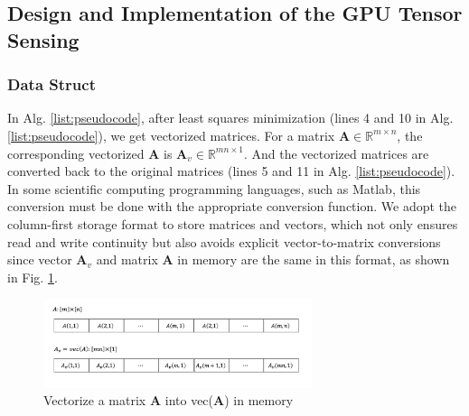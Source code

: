 \documentclass[futureinternet,article,submit,moreauthors,pdftex,10pt,a4paper]{Definitions/mdpi}
\theoremstyle{plain}
\theoremstyle{definition}
\theoremstyle{remark}
\begin{document}
\subsection{Design and Implementation of the GPU Tensor Sensing}
\subsubsection{Data Struct}
In Alg. \ref{list:pseudocode}, after least squares minimization (lines 4 and 10 in Alg. \ref{list:pseudocode}), we get vectorized matrices. For a matrix $\mathbf{A} \in \mathbb{R}^{m \times n}$, the corresponding vectorized $\mathbf{A}$ is $\mathbf{A}_v \in \mathbb{R}^{mn \times 1}$. And the vectorized matrices are converted back to the original matrices (lines 5 and 11 in Alg. \ref{list:pseudocode}). In some scientific computing programming languages, such as Matlab, this conversion must be done with the appropriate conversion function.
We adopt the column-first storage format to store matrices and vectors, which not only ensures read and write continuity but also avoids explicit vector-to-matrix conversions since vector $\mathbf{A}_v$ and matrix $\mathbf{A}$ in memory are the same in this format, as shown in Fig. \ref{Fig:vec2mat}.

\begin{figure}[H]
\centering
\includegraphics[width=0.7\textwidth]{vec2mat.png}
\caption{Vectorize a matrix $\mathbf{A}$ into vec($\mathbf{A}$) in memory}
\label{Fig:vec2mat}
\end{figure}
\end{document}
